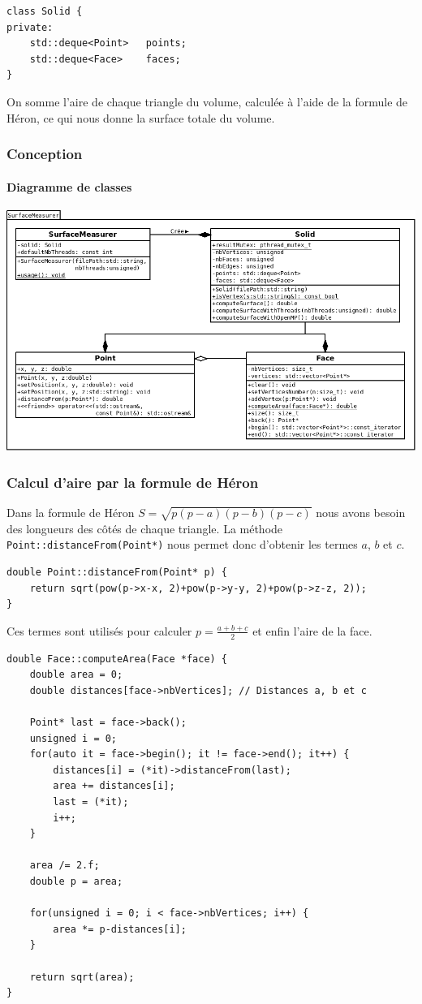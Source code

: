 \documentclass[a4paper]{article}
\begin{document}
		\begin{lstlisting}
class Solid {
private:
    std::deque<Point>   points;
    std::deque<Face>    faces;
}
		\end{lstlisting}

		On somme l'aire de chaque triangle du volume, calculée à l'aide de la formule de Héron, ce qui nous donne la surface totale du volume.
		\subsubsection{Conception}
		\paragraph{Diagramme de classes}

		\begin{center}
			\includegraphics[scale = 0.37]{class_diagram.png}
		\end{center}

		\subsubsection{Calcul d'aire par la formule de Héron}
		Dans la formule de Héron $S = \sqrt{p(p-a)(p-b)(p-c)}$ nous avons besoin des longueurs des côtés de chaque triangle. La méthode \texttt{Point::distanceFrom(Point*)} nous permet donc d'obtenir les termes $a$, $b$ et $c$.
		\begin{lstlisting}
double Point::distanceFrom(Point* p) {
	return sqrt(pow(p->x-x, 2)+pow(p->y-y, 2)+pow(p->z-z, 2));
}
		\end{lstlisting}

		Ces termes sont utilisés pour calculer $\displaystyle p = \frac{a+b+c}{2}$ et enfin l'aire de la face.
		\begin{lstlisting}
double Face::computeArea(Face *face) {
	double area = 0;
	double distances[face->nbVertices]; // Distances a, b et c

	Point* last = face->back();
	unsigned i = 0;
	for(auto it = face->begin(); it != face->end(); it++) {
	    distances[i] = (*it)->distanceFrom(last);
	    area += distances[i];
	    last = (*it);
	    i++;
	}

	area /= 2.f;
	double p = area;

	for(unsigned i = 0; i < face->nbVertices; i++) {
	    area *= p-distances[i];
	}

	return sqrt(area);
}
		\end{lstlisting}
\end{document}

